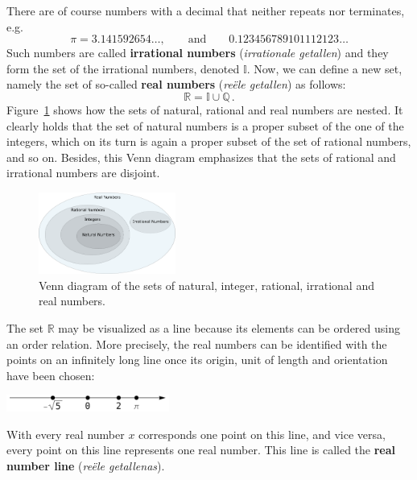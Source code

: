 There are of course numbers with a decimal that neither repeats nor terminates, e.g.  
$$
\pi=3.141592654\ldots, \qquad \mbox{and}\qquad 0.123456789101112123\ldots
$$
Such numbers are called \textbf{irrational numbers} (\textit{irrationale getallen}) and they form the set of the irrational numbers, denoted $\mathbb{I}$. Now, we can define a new set, namely the set of so-called \textbf{real numbers} (\textit{re\"ele getallen}) as follows:
$$
\mathbb{R}=\mathbb{I}\cup\mathbb{Q}\,.
$$
Figure~\ref{fig_sets_6} shows how the sets of natural, rational and real numbers are nested. It clearly holds that the set of natural numbers is a proper subset of the one of the integers, which on its turn is again a proper subset of the set of rational numbers, and so on. Besides, this Venn diagram emphasizes that the sets of rational and irrational numbers are disjoint. 


\begin{figure}
	\begin{center}
		\includegraphics[width=0.4\textwidth]{fig_sets_6}
		\caption{Venn diagram of the sets of natural, integer, rational, irrational and real numbers.}
		\label{fig_sets_6}
	\end{center}
\end{figure}



The set $\mathbb R$ may be visualized as a line because its elements can be ordered using an order relation. More precisely, the real numbers can be identified with the points on an infinitely long line once its origin, unit of length and orientation have been chosen:
\begin{center}
	\includegraphics[width=0.4\textwidth]{fig_sets_7}
\end{center}
With every real number $x$ corresponds one point on this line, and vice versa, every point on this line represents one real number. This line is called the \textbf{real number line} (\textit{re\"ele getallenas}). 



